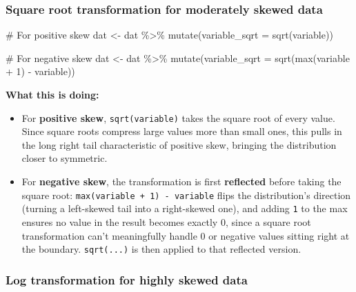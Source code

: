 \documentclass[
  letterpaper,
  DIV=11,
  numbers=noendperiod]{scrreprt}
\newenvironment{Shaded}{\begin{snugshade}}{\end{snugshade}}
\newcommand{\AttributeTok}[1]{\textcolor[rgb]{0.40,0.45,0.13}{#1}}
\newcommand{\CommentTok}[1]{\textcolor[rgb]{0.37,0.37,0.37}{#1}}
\newcommand{\DecValTok}[1]{\textcolor[rgb]{0.68,0.00,0.00}{#1}}
\newcommand{\FunctionTok}[1]{\textcolor[rgb]{0.28,0.35,0.67}{#1}}
\newcommand{\NormalTok}[1]{\textcolor[rgb]{0.00,0.23,0.31}{#1}}
\newcommand{\OtherTok}[1]{\textcolor[rgb]{0.00,0.23,0.31}{#1}}
\newcommand{\SpecialCharTok}[1]{\textcolor[rgb]{0.37,0.37,0.37}{#1}}
\begin{document}
\subsubsection{Square root transformation for moderately skewed
data}\label{square-root-transformation-for-moderately-skewed-data}

\begin{Shaded}
\begin{Highlighting}[]
\CommentTok{\# For positive skew}
\NormalTok{dat }\OtherTok{\textless{}{-}}\NormalTok{ dat }\SpecialCharTok{\%\textgreater{}\%}
  \FunctionTok{mutate}\NormalTok{(}\AttributeTok{variable\_sqrt =} \FunctionTok{sqrt}\NormalTok{(variable))}

\CommentTok{\# For negative skew}
\NormalTok{dat }\OtherTok{\textless{}{-}}\NormalTok{ dat }\SpecialCharTok{\%\textgreater{}\%}
  \FunctionTok{mutate}\NormalTok{(}\AttributeTok{variable\_sqrt =} \FunctionTok{sqrt}\NormalTok{(}\FunctionTok{max}\NormalTok{(variable }\SpecialCharTok{+} \DecValTok{1}\NormalTok{) }\SpecialCharTok{{-}}\NormalTok{ variable))}
\end{Highlighting}
\end{Shaded}

\textbf{What this is doing:}

\begin{itemize}
\item
  For \textbf{positive skew}, \texttt{sqrt(variable)} takes the square
  root of every value. Since square roots compress large values more
  than small ones, this pulls in the long right tail characteristic of
  positive skew, bringing the distribution closer to symmetric.
\item
  For \textbf{negative skew}, the transformation is first
  \textbf{reflected} before taking the square root:
  \texttt{max(variable\ +\ 1)\ -\ variable} flips the distribution's
  direction (turning a left-skewed tail into a right-skewed one), and
  adding \texttt{1} to the max ensures no value in the result becomes
  exactly 0, since a square root transformation can't meaningfully
  handle 0 or negative values sitting right at the boundary.
  \texttt{sqrt(...)} is then applied to that reflected version.
\end{itemize}

\subsubsection{Log transformation for highly skewed
data}\label{log-transformation-for-highly-skewed-data}
\end{document}
